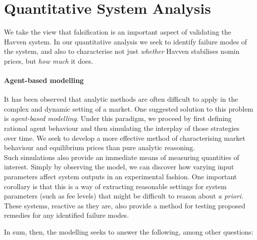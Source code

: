 \section{Quantitative System Analysis}

We take the view that falsification is an important aspect of validating
the Havven system. In our quantitative analysis we seek to identify failure modes
of the system, and also to characterise not just \textit{whether} Havven stabilises
nomin prices, but \textit{how much} it does.


\paragraph{Agent-based modelling} It has been observed that analytic methods are often difficult to
apply in the complex and dynamic setting of a market.
One suggested solution to this problem is \textit{agent-based modelling}.
Under this paradigm, we proceed by first defining rational agent behaviour
and then simulating the interplay of those strategies over time.
We seek to develop a more effective
method of characterising market behaviour and equilibrium prices than pure analytic reasoning.~\cite{poggio2001agent}\\

\noindent Such simulations also provide an immediate means of measuring
quantities of interest. Simply by observing
the model, we can discover how varying input parameters
affect system outputs in an experimental fashion.
One important corollary is that this is a way of extracting reasonable
settings for system parameters (such as fee levels) that might be difficult
to reason about \textit{a priori}. These systems, reactive as they are,
also provide a method for testing proposed remedies for any identified failure
modes.


\noindent In sum, then, the modelling seeks to answer the following, among other questions:

